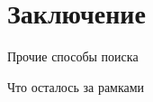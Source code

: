 \section{Заключение}

\begin{frame}{Прочие способы поиска}
    
\end{frame}

\begin{frame}{Что осталось за рамками}
    
\end{frame}
